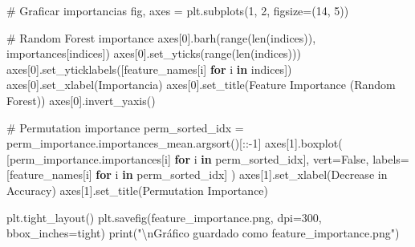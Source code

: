 \documentclass[
  doc,
  floatsintext,
  longtable,
  a4paper,
  nolmodern,
  notxfonts,
  notimes,
  12pt,
  colorlinks=true,linkcolor=blue,citecolor=blue,urlcolor=blue]{apa7}
\newenvironment{Shaded}{\begin{snugshade}}{\end{snugshade}}
\newcommand{\BuiltInTok}[1]{\textcolor[rgb]{0.00,0.23,0.31}{#1}}
\newcommand{\CharTok}[1]{\textcolor[rgb]{0.13,0.47,0.30}{#1}}
\newcommand{\CommentTok}[1]{\textcolor[rgb]{0.37,0.37,0.37}{#1}}
\newcommand{\ControlFlowTok}[1]{\textcolor[rgb]{0.00,0.23,0.31}{\textbf{#1}}}
\newcommand{\DecValTok}[1]{\textcolor[rgb]{0.68,0.00,0.00}{#1}}
\newcommand{\KeywordTok}[1]{\textcolor[rgb]{0.00,0.23,0.31}{\textbf{#1}}}
\newcommand{\NormalTok}[1]{\textcolor[rgb]{0.00,0.23,0.31}{#1}}
\newcommand{\OperatorTok}[1]{\textcolor[rgb]{0.37,0.37,0.37}{#1}}
\newcommand{\StringTok}[1]{\textcolor[rgb]{0.13,0.47,0.30}{#1}}
\newcommand{\VariableTok}[1]{\textcolor[rgb]{0.07,0.07,0.07}{#1}}
\begin{document}
\begin{Shaded}
\begin{Highlighting}[]
\CommentTok{\# Graficar importancias}
\NormalTok{fig, axes }\OperatorTok{=}\NormalTok{ plt.subplots(}\DecValTok{1}\NormalTok{, }\DecValTok{2}\NormalTok{, figsize}\OperatorTok{=}\NormalTok{(}\DecValTok{14}\NormalTok{, }\DecValTok{5}\NormalTok{))}

\CommentTok{\# Random Forest importance}
\NormalTok{axes[}\DecValTok{0}\NormalTok{].barh(}\BuiltInTok{range}\NormalTok{(}\BuiltInTok{len}\NormalTok{(indices)), importances[indices])}
\NormalTok{axes[}\DecValTok{0}\NormalTok{].set\_yticks(}\BuiltInTok{range}\NormalTok{(}\BuiltInTok{len}\NormalTok{(indices)))}
\NormalTok{axes[}\DecValTok{0}\NormalTok{].set\_yticklabels([feature\_names[i] }\ControlFlowTok{for}\NormalTok{ i }\KeywordTok{in}\NormalTok{ indices])}
\NormalTok{axes[}\DecValTok{0}\NormalTok{].set\_xlabel(}\StringTok{\textquotesingle{}Importancia\textquotesingle{}}\NormalTok{)}
\NormalTok{axes[}\DecValTok{0}\NormalTok{].set\_title(}\StringTok{\textquotesingle{}Feature Importance (Random Forest)\textquotesingle{}}\NormalTok{)}
\NormalTok{axes[}\DecValTok{0}\NormalTok{].invert\_yaxis()}

\CommentTok{\# Permutation importance}
\NormalTok{perm\_sorted\_idx }\OperatorTok{=}\NormalTok{ perm\_importance.importances\_mean.argsort()[::}\OperatorTok{{-}}\DecValTok{1}\NormalTok{]}
\NormalTok{axes[}\DecValTok{1}\NormalTok{].boxplot(}
\NormalTok{    [perm\_importance.importances[i] }\ControlFlowTok{for}\NormalTok{ i }\KeywordTok{in}\NormalTok{ perm\_sorted\_idx],}
\NormalTok{    vert}\OperatorTok{=}\VariableTok{False}\NormalTok{,}
\NormalTok{    labels}\OperatorTok{=}\NormalTok{[feature\_names[i] }\ControlFlowTok{for}\NormalTok{ i }\KeywordTok{in}\NormalTok{ perm\_sorted\_idx]}
\NormalTok{)}
\NormalTok{axes[}\DecValTok{1}\NormalTok{].set\_xlabel(}\StringTok{\textquotesingle{}Decrease in Accuracy\textquotesingle{}}\NormalTok{)}
\NormalTok{axes[}\DecValTok{1}\NormalTok{].set\_title(}\StringTok{\textquotesingle{}Permutation Importance\textquotesingle{}}\NormalTok{)}

\NormalTok{plt.tight\_layout()}
\NormalTok{plt.savefig(}\StringTok{\textquotesingle{}feature\_importance.png\textquotesingle{}}\NormalTok{, dpi}\OperatorTok{=}\DecValTok{300}\NormalTok{, bbox\_inches}\OperatorTok{=}\StringTok{\textquotesingle{}tight\textquotesingle{}}\NormalTok{)}
\BuiltInTok{print}\NormalTok{(}\StringTok{"}\CharTok{\textbackslash{}n}\StringTok{Gráfico guardado como \textquotesingle{}feature\_importance.png\textquotesingle{}"}\NormalTok{)}
\end{Highlighting}
\end{Shaded}
\end{document}
